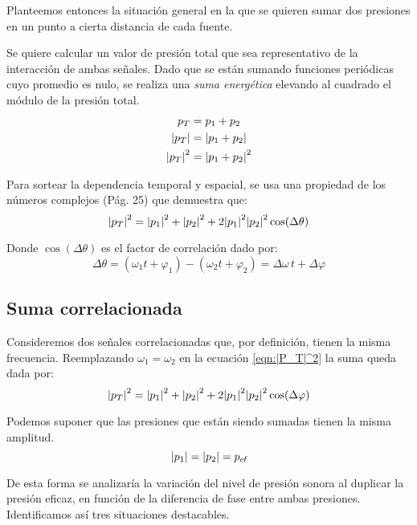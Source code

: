 \documentclass[a5paper,12pt,twoside]{book}
\begin{document}
Planteemos entonces la situación general en la que se quieren sumar dos presiones en un punto a cierta distancia de cada fuente.

Se quiere calcular un valor de presión total que sea representativo de la interacción de ambas señales. Dado que se están sumando funciones periódicas cuyo promedio es nulo, se realiza una \emph{suma energética} elevando al cuadrado el módulo de la presión total.
\begin{align*}
    p_T &= p_1 + p_2
    \\
    {\left| {p_T} \right|} &= {\left| {p_1 + p_2} \right|}
    \\
    {\left| {p_T} \right|}^2 &= {\left| {p_1 + p_2} \right|}^2
\end{align*}

Para sortear la dependencia temporal y espacial, se usa una propiedad de los números complejos \cite{2} (Pág. 25) que demuestra que:
\begin{equation}
    {\left| {p_T} \right|}^2 = {\left| {p_1} \right|}^2 + {\left| {p_2} \right|}^2 + 2 {\left| {p_1} \right|}^2 {\left| {p_2} \right|}^2 \cos(\Delta \theta)
    \label{eqn:|P_T|^2}
\end{equation}

Donde $\cos(\Delta \theta)$ es el factor de correlación dado por:
\begin{equation*}
    \Delta \theta = \left( \omega_1 t + \varphi_1 \right) - \left( \omega_2 t + \varphi_2 \right) = \Delta \omega \, t + \Delta \varphi
\end{equation*}


\subsection{Suma correlacionada}

Consideremos dos señales correlacionadas que, por definición, tienen la misma frecuencia. Reemplazando $\omega_1=\omega_2$ en la ecuación \ref{eqn:|P_T|^2} la suma queda dada por:
\begin{equation*}
    {\left| {p_T} \right|}^2 = {\left| {p_1} \right|}^2 + {\left| {p_2} \right|}^2 + 2 {\left| {p_1} \right|}^2 {\left| {p_2} \right|}^2 \cos(\Delta \varphi)
\end{equation*}

Podemos suponer que las presiones que están siendo sumadas tienen la misma amplitud.
\begin{equation*}
    {\left| {p_1} \right|} = {\left| {p_2} \right|} = {{{p}_\textsl{{ef}}}}
\end{equation*}

De esta forma se analizaría la variación del nivel de presión sonora al duplicar la presión eficaz, en función de la diferencia de fase entre ambas presiones. Identificamos así tres situaciones destacables.
\end{document}
